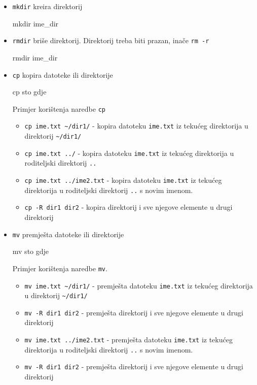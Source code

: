 \begin{itemize}
\item \texttt{mkdir} kreira direktorij
\begin{prototip}
mkdir ime_dir 
\end{prototip}

\item \texttt{rmdir} briše direktorij. Direktorij treba biti prazan, inače \texttt{rm -r}
\begin{prototip}
rmdir ime_dir 
\end{prototip}


\item \texttt{cp} kopira datoteke ili direktorije
\begin{prototip}
cp sto gdje 
\end{prototip}

\begin{primjer} Primjer korištenja naredbe \texttt{cp}
\begin{itemize}
 \item \lstinline!cp ime.txt ~/dir1/! - kopira datoteku \texttt{ime.txt} iz tekućeg direktorija u direktorij \lstinline!~/dir1/!
\item \lstinline!cp ime.txt ../! - kopira datoteku \texttt{ime.txt} iz tekućeg direktorija u roditeljski direktorij \texttt{..}
\item \lstinline!cp ime.txt ../ime2.txt! - kopira datoteku \texttt{ime.txt} iz tekućeg direktorija u roditeljski direktorij \texttt{..} s novim imenom.
 \item \lstinline!cp -R dir1 dir2! - kopira direktorij i sve njegove elemente u drugi direktorij 
\end{itemize}
\end{primjer}

\item \texttt{mv} premješta datoteke ili direktorije
\begin{prototip}
mv sto gdje
\end{prototip}

\begin{primjer} Primjer korištenja naredbe \texttt{mv}.
\begin{itemize}
 \item \lstinline!mv ime.txt ~/dir1/! - premješta datoteku \texttt{ime.txt} iz tekućeg direktorija u direktorij \lstinline!~/dir1/!
 \item \lstinline!mv -R dir1 dir2! - premješta direktorij i sve njegove elemente u drugi direktorij 
\item \lstinline!mv ime.txt ../ime2.txt! - premješta datoteku \texttt{ime.txt} iz tekućeg direktorija u roditeljski direktorij \texttt{..} s novim imenom.
 \item \lstinline!mv -R dir1 dir2! - premješta direktorij i sve njegove elemente u drugi direktorij 
\end{itemize}
\end{primjer}

\end{itemize}
